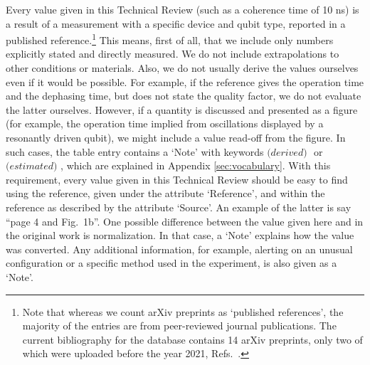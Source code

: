 \documentclass[aps, prx, showpacs, twocolumn, superscriptaddress, notitlepage, longbibliography, floatfix, nofootinbib]{revtex4-2}
\newcommand{\estimated}{\textit{(estimated) }}
\newcommand{\derived}{\textit{(derived) }}
\newcommand{\myKey}[1]{$\whitearrowupfrombar$\textit{#1}}
\renewcommand{\myKey}[1]{\textit{#1}}
\renewcommand{\myKey}[1]{`{#1}'}
\newcommand{\recheck}[1]{{#1}}
\begin{document}
Every value given in this Technical Review (such as a coherence time of 10 ns) is a result of a measurement with a specific device and qubit type, reported in a published reference.\footnote{\recheck{Note that whereas we count arXiv preprints as `published references', the majority of the entries are from peer-reviewed journal publications. The current bibliography for the database contains 14 arXiv preprints, only two of which were uploaded before the year 2021, Refs.~\cite{hayes_lifetime_2009,cerfontaine_feedback-tuned_2016}.}} This means, first of all, that we include only numbers explicitly stated and directly measured. We do not include extrapolations to other conditions or materials. Also, we do not usually derive the values ourselves even if it would be possible. For example, if the reference gives the operation time and the dephasing time, but does not state the quality factor, we do not evaluate the latter ourselves. However, if a quantity is discussed and presented as a figure (for example, the operation time implied from oscillations displayed by a resonantly driven qubit), we might include a value read-off from the figure. In such cases, the table entry contains a \myKey{Note} with keywords $\derived$\! or $\estimated$\!, which are explained in Appendix \ref{sec:vocabulary}. With this requirement, every value given in this Technical Review should be easy to find using the reference, given under the attribute \myKey{Reference}, and within the reference as described by the attribute \myKey{Source}. An example of the latter is say ``page 4 and Fig.~1b''. One possible difference between the value given here and in the original work is normalization. In that case, a \myKey{Note} explains how the value was converted. Any additional information, for example, alerting on an unusual configuration or a specific method used in the experiment, is also given as a \myKey{Note}. 
\end{document}

